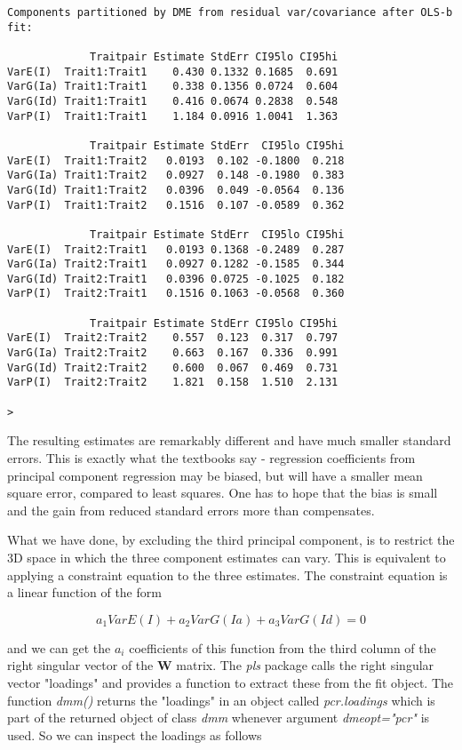 \documentclass[titlepage]{article}  %
\begin{document}
\begin{verbatim}
Components partitioned by DME from residual var/covariance after OLS-b fit:

             Traitpair Estimate StdErr CI95lo CI95hi
VarE(I)  Trait1:Trait1    0.430 0.1332 0.1685  0.691
VarG(Ia) Trait1:Trait1    0.338 0.1356 0.0724  0.604
VarG(Id) Trait1:Trait1    0.416 0.0674 0.2838  0.548
VarP(I)  Trait1:Trait1    1.184 0.0916 1.0041  1.363

             Traitpair Estimate StdErr  CI95lo CI95hi
VarE(I)  Trait1:Trait2   0.0193  0.102 -0.1800  0.218
VarG(Ia) Trait1:Trait2   0.0927  0.148 -0.1980  0.383
VarG(Id) Trait1:Trait2   0.0396  0.049 -0.0564  0.136
VarP(I)  Trait1:Trait2   0.1516  0.107 -0.0589  0.362

             Traitpair Estimate StdErr  CI95lo CI95hi
VarE(I)  Trait2:Trait1   0.0193 0.1368 -0.2489  0.287
VarG(Ia) Trait2:Trait1   0.0927 0.1282 -0.1585  0.344
VarG(Id) Trait2:Trait1   0.0396 0.0725 -0.1025  0.182
VarP(I)  Trait2:Trait1   0.1516 0.1063 -0.0568  0.360

             Traitpair Estimate StdErr CI95lo CI95hi
VarE(I)  Trait2:Trait2    0.557  0.123  0.317  0.797
VarG(Ia) Trait2:Trait2    0.663  0.167  0.336  0.991
VarG(Id) Trait2:Trait2    0.600  0.067  0.469  0.731
VarP(I)  Trait2:Trait2    1.821  0.158  1.510  2.131

> 
\end{verbatim}

 The resulting estimates are remarkably different and have much smaller standard errors. This is exactly what the textbooks say - regression coefficients from principal component regression may be biased, but will have a smaller mean square error, compared to least squares. One has to hope that the bias is small and the gain from reduced standard errors more than compensates.

 What we have done, by excluding the third principal component, is to restrict the 3D space in which the three component estimates can vary. This  is equivalent to applying a constraint equation to the three estimates.  The constraint equation is a linear function of the form

\begin{displaymath}
 a_{1} VarE(I) + a_{2} VarG(Ia) + a_{3} VarG(Id) = 0
\end{displaymath}

and we can get the $a_{i}$ coefficients of this function from the third column of the right singular vector of the $\bm{W}$ matrix. The {\em pls} package calls the right singular vector "loadings" and provides a function to extract these from the fit object. The function {\em dmm()} returns the "loadings" in an object called {\em pcr.loadings} which is part of the returned object of class {\em dmm} whenever  argument {\em dmeopt="pcr"} is used. So we can inspect the loadings as follows
\end{document}
